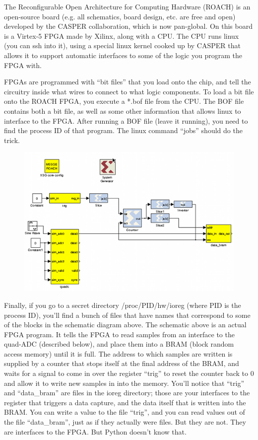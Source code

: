 \documentclass[11pt]{article}
\begin{document}
The Reconfigurable Open Architecture for Computing Hardware (ROACH) is an open-source board (e.g.
all schematics, board design, etc. are free and open) developed by the CASPER collaboration, which
is now pan-global.  On this board is a Virtex-5 FPGA made by Xilinx, along with a CPU.  The CPU
runs linux (you can ssh into it), using a special linux kernel cooked up by CASPER that allows it to support 
automatic interfaces to some of the logic you program the FPGA with.

FPGAs are programmed with ``bit files'' that you load onto the chip, and tell the circuitry inside what
wires to connect to what logic components.  To load a bit file onto the ROACH FPGA, you execute a *.bof file
from the CPU.  The BOF file contains both a bit file, as well as some other information that allows
linux to interface to the FPGA.  After running a BOF file (leave it running), you need to find the 
process ID of that program.  The linux command ``jobs'' should do the trick.

\begin{figure}\centering
\includegraphics[width=6in]{digital_lab_1_plots/adc_capture.png}
\end{figure}

Finally, if you go to a secret directory /proc/PID/hw/ioreg (where PID is the process ID), you'll find
a bunch of files that have names that correspond to some of the blocks in the schematic diagram above.
The schematic above is an actual FPGA program.  It tells the FPGA to read samples from an interface to
the quad-ADC (described below), and place them into a BRAM (block random access memory) until it is full.
The address to which samples are written is supplied by a counter that stops itself at the final address
of the BRAM, and waits for a signal to come in over the register ``trig'' to reset the counter back to
0 and allow it to write new samples in into the memory.  You'll notice that ``trig'' and ``data\_bram''
are files in the ioreg directory; those are your interfaces to the register that triggers a data capture,
and the data itself that is written into the BRAM.  You can write a value to the file ``trig'', and you can
read values out of the file ``data\_bram'', just as if they actually were files.  But they are not.  They
are interfaces to the FPGA.  But Python doesn't know that.
\end{document}
